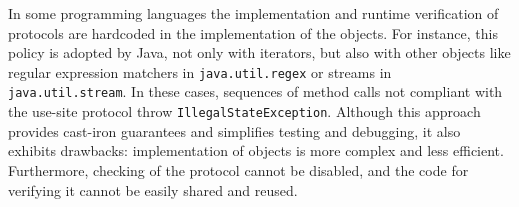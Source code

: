 In some programming languages the implementation and runtime verification of protocols are hardcoded in the implementation of the objects. For instance, this policy is adopted by Java, not only with iterators, but also with other objects like regular expression matchers in \lstinline|java.util.regex| or streams in \lstinline|java.util.stream|. In these cases, sequences of method calls not compliant with the use-site protocol throw \lstinline{IllegalStateException}.
Although this approach provides cast-iron guarantees and simplifies testing and debugging, it also exhibits drawbacks: implementation of objects is more  complex and less efficient. Furthermore, checking of the protocol cannot be disabled, and the code for verifying it cannot be easily shared and reused.




